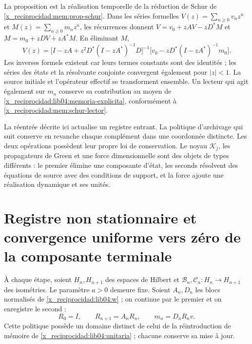 La proposition est la réalisation temporelle de la réduction de Schur de
\cref{x_reciprocidad:mem:prop-schur}. Dans les séries formelles
\(V(z)=\sum_{n\geq0}v_nz^n\) et
\(M(z)=\sum_{n\geq0}m_nz^n\), les récurrences donnent
\(V=v_0+zAV-zD^*M\) et \(M=m_0+zDV+zA^*M\). En éliminant \(M\),
\begin{equation}
 V(z)=\bigl[I-zA+z^2D^*(I-zA^*)^{-1}D\bigr]^{-1}
       \bigl[v_0-zD^*(I-zA^*)^{-1}m_0\bigr].
 \label{x_reciprocidad:lib04:schur-bilateral}
\end{equation}
Les inverses formels existent car leurs termes constants sont des identités ;
les séries des états et la résolvante conjointe convergent également pour
\(|z|<1\). La source initiale et l’opérateur effectif se transforment ensemble.
Un lecteur qui agit également sur \(m_n\) conserve sa contribution au moyen de
\eqref{x_reciprocidad:lib04:memoria-explicita}, conformément à \eqref{x_reciprocidad:mem:schur-lector}.

La réentrée décrite ici actualise un registre entrant. La politique
d’archivage qui suit conserve en revanche chaque complément dans une coordonnée
distincte. Les deux opérations possèdent leur propre loi de conservation. Le noyau
\(\mathscr K_j\), les propagateurs de Green et une force dimensionnelle sont
des objets de types différents : le premier élimine une composante d’état,
les seconds résolvent des équations de source avec des conditions de support, et
la force ajoute une réalisation dynamique et ses unités.



\section{Registre non stationnaire et convergence uniforme vers zéro de la composante terminale}
\label{x_reciprocidad:lib04:archivo}

À chaque étape, soient \(H_n,H_{n+1}\) des espaces de Hilbert et
\(\mathcal B_n,\mathcal C_n:H_n\to H_{n+1}\) des isométries. Le
paramètre \(a>0\) demeure fixe. Soient \(A_n,D_n\) les blocs
normalisés de \eqref{x_reciprocidad:lib04:w} ; on continue par le premier et on
enregistre le second :
\begin{equation}
 R_0=I,\qquad R_{n+1}=A_nR_n,\qquad m_n=D_nR_nv.
 \label{x_reciprocidad:lib04:politica-archivo}
\end{equation}
Cette politique possède un domaine distinct de celui de la réintroduction de
mémoire de \eqref{x_reciprocidad:lib04:unitaria} ; chacune conserve sa mise à jour.

